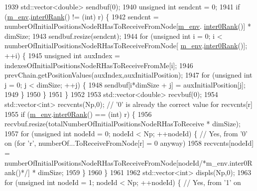 \begin{DoxyCode}
1939     std::vector<double> sendbuf(0);
1940     \textcolor{keywordtype}{unsigned} \textcolor{keywordtype}{int} sendcnt = 0;
1941     \textcolor{keywordflow}{if} (\hyperlink{class_q_u_e_s_o_1_1_m_l_sampling_a13f1ca4fe9f94822fe572a743eaced1d}{m\_env}.\hyperlink{class_q_u_e_s_o_1_1_base_environment_ae106b5bb8a80b655b88b3a26b1e7c185}{inter0Rank}() != (int) r) \{
1942       sendcnt = numberOfInitialPositionsNodeRHasToReceiveFromNode[\hyperlink{class_q_u_e_s_o_1_1_m_l_sampling_a13f1ca4fe9f94822fe572a743eaced1d}{m\_env}.
      \hyperlink{class_q_u_e_s_o_1_1_base_environment_ae106b5bb8a80b655b88b3a26b1e7c185}{inter0Rank}()] * dimSize;
1943       sendbuf.resize(sendcnt);
1944       \textcolor{keywordflow}{for} (\textcolor{keywordtype}{unsigned} \textcolor{keywordtype}{int} i = 0; i < numberOfInitialPositionsNodeRHasToReceiveFromNode[
      \hyperlink{class_q_u_e_s_o_1_1_m_l_sampling_a13f1ca4fe9f94822fe572a743eaced1d}{m\_env}.\hyperlink{class_q_u_e_s_o_1_1_base_environment_ae106b5bb8a80b655b88b3a26b1e7c185}{inter0Rank}()]; ++i) \{
1945         \textcolor{keywordtype}{unsigned} \textcolor{keywordtype}{int} auxIndex = indexesOfInitialPositionsNodeRHasToReceiveFromMe[i];
1946         prevChain.getPositionValues(auxIndex,auxInitialPosition);
1947         \textcolor{keywordflow}{for} (\textcolor{keywordtype}{unsigned} \textcolor{keywordtype}{int} j = 0; j < dimSize; ++j) \{
1948           sendbuf[i*dimSize + j] = auxInitialPosition[j];
1949         \}
1950       \}
1951     \}
1952 
1953     std::vector<double> recvbuf(0);
1954     std::vector<int> recvcnts(Np,0); \textcolor{comment}{// '0' is already the correct value for recvcnts[r]}
1955     \textcolor{keywordflow}{if} (\hyperlink{class_q_u_e_s_o_1_1_m_l_sampling_a13f1ca4fe9f94822fe572a743eaced1d}{m\_env}.\hyperlink{class_q_u_e_s_o_1_1_base_environment_ae106b5bb8a80b655b88b3a26b1e7c185}{inter0Rank}() == (int) r) \{
1956       recvbuf.resize(totalNumberOfInitialPositionsNodeRHasToReceive * dimSize);
1957       \textcolor{keywordflow}{for} (\textcolor{keywordtype}{unsigned} \textcolor{keywordtype}{int} nodeId = 0; nodeId < Np; ++nodeId) \{ \textcolor{comment}{// Yes, from '0' on (for 'r',
       numberOf...ToReceiveFromNode[r] = 0 anyway)}
1958         recvcnts[nodeId] = numberOfInitialPositionsNodeRHasToReceiveFromNode[nodeId\textcolor{comment}{/*m\_env.inter0Rank()*/}] 
      * dimSize;
1959       \}
1960     \}
1961 
1962     std::vector<int> displs(Np,0);
1963     \textcolor{keywordflow}{for} (\textcolor{keywordtype}{unsigned} \textcolor{keywordtype}{int} nodeId = 1; nodeId < Np; ++nodeId) \{ \textcolor{comment}{// Yes, from '1' on}

\end{DoxyCode}
